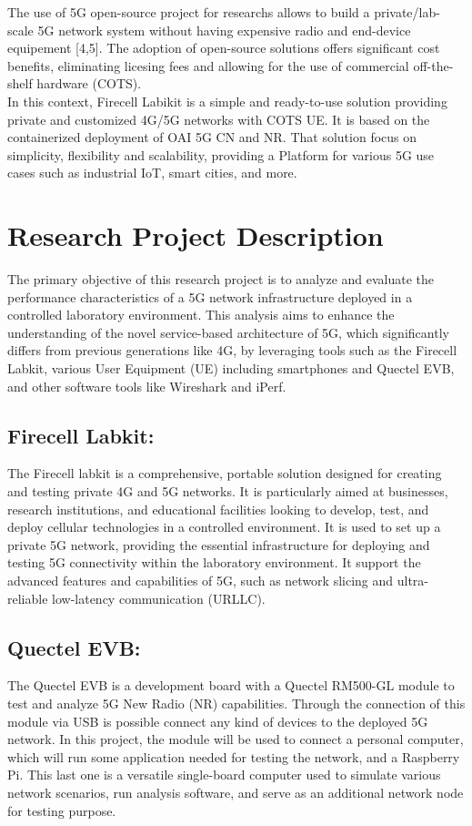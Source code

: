 \documentclass{report}
\begin{document}
The use of 5G open-source project for researchs allows to build a private/lab-scale 5G network system without having expensive radio and end-device equipement [4,5]. The adoption of open-source solutions offers significant cost benefits, eliminating licesing fees and allowing for the use of commercial off-the-shelf hardware (COTS).\\
In this context, Firecell Labikit is a simple and ready-to-use solution providing private and customized 4G/5G networks with COTS UE. It is based on the containerized deployment of OAI 5G CN and NR. That solution focus on simplicity, flexibility and scalability, providing a Platform for various 5G use cases such as industrial IoT, smart cities, and more.  
\chapter{Research Project Description}
The primary objective of this research project is to analyze and evaluate the performance characteristics of a 5G network infrastructure deployed in a controlled laboratory environment. This analysis aims to enhance the understanding of the novel service-based architecture of 5G, which significantly differs from previous generations like 4G, by leveraging tools such as the Firecell Labkit, various User Equipment (UE) including smartphones and Quectel EVB, and other software tools like Wireshark and iPerf.
\section*{Firecell Labkit:}
The Firecell labkit is a comprehensive, portable solution designed for creating and testing private 4G and 5G networks. It is particularly aimed at businesses, research institutions, and educational facilities looking to develop, test, and deploy cellular technologies in a controlled environment. It is used to set up a private 5G network, providing the essential infrastructure for deploying and testing 5G connectivity within the laboratory environment. It support the advanced features and capabilities of 5G, such as network slicing and ultra-reliable low-latency communication (URLLC). 
\section*{Quectel EVB:}
The Quectel EVB is a development board with a Quectel RM500-GL module to test and analyze 5G New Radio (NR) capabilities. Through the connection of this module via USB is possible connect any kind of devices to the deployed 5G network. In this project, the module will be used to connect a personal computer, which will run some application needed for testing the network, and a Raspberry Pi. This last one is a versatile single-board computer used to simulate various network scenarios, run analysis software, and serve as an additional network node for testing purpose. 
\end{document}
